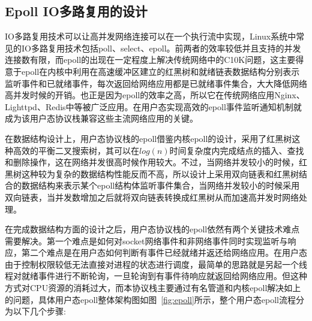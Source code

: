 \subsection{Epoll IO多路复用的设计}

IO多路复用技术可以让高并发网络连接可以在一个执行流中实现，Linux系统中常见的IO多路复用技术包括poll、select、epoll。前两者的效率较低并且支持的并发连接数有限，而epoll的出现在一定程度上解决传统网络中的C10K问题，这主要得意于epoll在内核中利用在高速缓冲区建立的红黑树和就绪链表数据结构分别表示监听事件和已就绪事件，每次返回给网络应用都是已就绪事件集合，大大降低网络高并发时候的开销。也正是因为epoll的效率之高，所以它在传统网络应用Nginx、Lighttpd、Redis中等被广泛应用。在用户态实现高效的epoll事件监听通知机制就成为该用户态协议栈兼容这些主流网络应用的关键。

在数据结构设计上，用户态协议栈的epoll借鉴内核epoll的设计，采用了红黑树这种高效的平衡二叉搜索树，其可以在$log(n)$时间复杂度内完成结点的插入、查找和删除操作，这在网络并发很高时候作用较大。不过，当网络并发较小的时候，红黑树这种较为复杂的数据结构性能反而不高，所以设计上采用双向链表和红黑树结合的数据结构来表示某个epoll结构体监听事件集合，当网络并发较小的时候采用双向链表，当并发数增加之后就将双向链表转换成红黑树从而加速高并发时网络处理。

在完成数据结构方面的设计之后，用户态协议栈的epoll依然有两个关键技术难点需要解决。第一个难点是如何对socket网络事件和非网络事件同时实现监听与响应，第二个难点是在用户态如何判断有事件已经就绪并返还给网络应用。在用户态由于控制权限较低无法直接对进程的状态进行调度，最简单的思路就是另起一个线程对就绪事件进行不断轮询，一旦轮询到有事件待响应就返回给网络应用。但这种方式对CPU资源的消耗过大，而本协议栈主要通过有名管道和内核epoll解决如上的问题，具体用户态epoll整体架构图如图~\ref{fig:epoll}所示，整个用户态epoll流程分为以下几个步骤:

